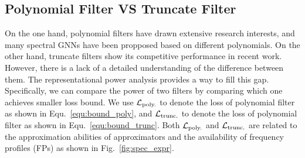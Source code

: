 \documentclass{article} %
\begin{document}
	\subsection{Polynomial Filter VS Truncate Filter}
	\label{sec:vs}
	On the one hand, polynomial filters have drawn extensive research interests, and many spectral GNNs have been propposed based on different polynomials.
	On the other hand, truncate filters show its competitive performance in recent work.
	However, there is a lack of a detailed understanding of the difference between them.
	The representational power analysis provides a way to fill this gap.
	Specifically, we can compare the power of two filters by comparing which one achieves smaller loss bound.
	We use ${\mathcal{L}}_{\textrm{poly.}}$ to denote the loss of polynomial filter as shown in Equ.~\ref{equ:bound_poly}, and ${\mathcal{L}}_{\textrm{trunc.}}$ to denote the loss of polynomial filter as shown in Equ.~\ref{equ:bound_trunc}.
	Both ${\mathcal{L}}_{\textrm{poly.}}$ and ${\mathcal{L}}_{\textrm{trunc.}}$ are related to the approximation abilities of approximators and the availability of frequency profiles (FPs) as shown in Fig.~\ref{fig:spec_expr}.
	
\end{document}
